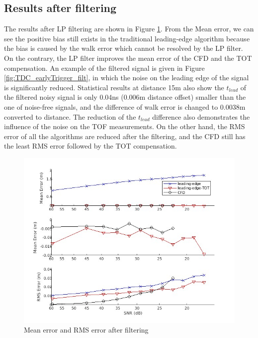 \subsection{Results after filtering}
The results after LP filtering are shown in Figure \ref{fig:TDC_Error_afterFilter}. From the Mean error, we can see the positive bias still exists in the traditional leading-edge algorithm because the bias is caused by the walk error which cannot be resolved by the LP filter. On the contrary, the LP filter improves the mean error of the CFD and the TOT compensation. An example of the filtered signal is given in Figure \ref{fig:TDC_earlyTrigger_filt}, in which the noise on the leading edge of the signal is significantly reduced. Statistical results at distance 15m also show the $t_{lead}$ of the filtered noisy signal is only 0.04ns (0.006m distance offset) smaller than the one of noise-free signals, and the difference of walk error is changed to 0.0038m converted to distance. The reduction of the $t_{lead}$ difference also demonstrates the influence of the noise on the TOF measurements. On the other hand, the RMS error of all the algorithms are reduced after the filtering, and the CFD still has the least RMS error followed by the TOT compensation.
\begin{figure}[t!p]
\centering
\includegraphics[width=.8\textwidth]{figures/chapter7_TDC/fig_distError_snr_filter.jpg}
\caption{Mean error and RMS error after filtering}
\label{fig:TDC_Error_afterFilter}
\end{figure}

